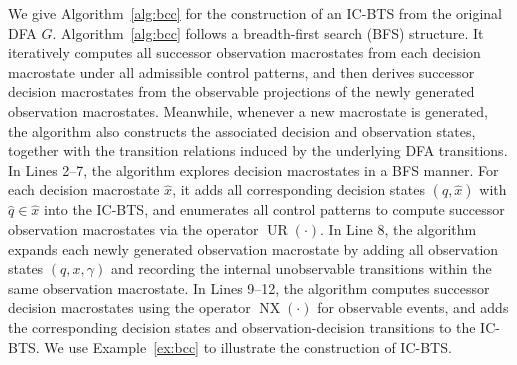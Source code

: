 \documentclass[twocolumn]{autart}
\def \UR{\operatorname{UR}}
\def \NX{\operatorname{NX}}
\begin{document}
%
We give Algorithm~\ref{alg:bcc} for the construction of an IC-BTS from the original DFA $G$.
Algorithm~\ref{alg:bcc} follows a breadth-first search (BFS) structure.
It iteratively computes all successor observation macrostates from each decision macrostate under all admissible control patterns, and then derives successor decision macrostates from the observable projections of the newly generated observation macrostates.
Meanwhile, whenever a new macrostate is generated, the algorithm also constructs the associated decision and observation states, together with the transition relations induced by the underlying DFA transitions.
%
In Lines 2--7, the algorithm explores decision macrostates in a BFS manner.
For each decision macrostate $\hat{x}$, it adds all corresponding decision states $(\hat{q}, \hat{x})$ with $\hat{q} \in \hat{x}$ into the IC-BTS, and enumerates all control patterns to compute successor observation macrostates via the operator $\UR(\cdot)$.
%
In Line 8, the algorithm expands each newly generated observation macrostate by adding all observation states $(q, x, \gamma)$ and recording the internal unobservable transitions within the same observation macrostate.
%
In Lines 9--12, the algorithm computes successor decision macrostates using the operator $\NX(\cdot)$ for observable events, and adds the corresponding decision states and observation-decision transitions to the IC-BTS.
%
We use Example~\ref{ex:bcc} to illustrate the construction of IC-BTS.
%
\end{document}
